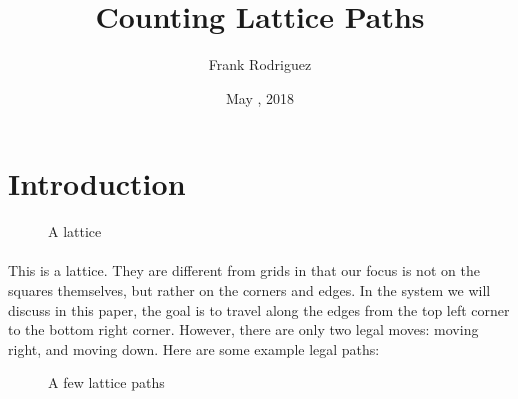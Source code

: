 \documentclass[12pt]{article}
\title{Counting Lattice Paths}
\author{Frank Rodriguez}
\date{May \nth{4}, 2018}
\newcommand{\p}{\paragraph{}}
\begin{document}
	\maketitle
	\newpage
	
	\tableofcontents
	\newpage
	
	\section{Introduction}
	
		\begin{figure}[h]
			\centering
			
			\caption{A lattice}
		\end{figure}
		
		\p This is a lattice. They are different from grids in that our focus is not on the squares themselves, but rather on the corners and edges. In the system we will discuss in this paper, the goal is to travel along the edges from the top left corner to the bottom right corner. However, there are only two legal moves: moving right, and moving down. Here are some example legal paths:
		
		\begin{figure}[h]
			\centering
			\begin{subfigure}{.3\textwidth}
				\centering
			\end{subfigure}%
			\begin{subfigure}{.3\textwidth}
				\centering
			\end{subfigure}%
			\begin{subfigure}{.3\textwidth}
				\centering
			\end{subfigure}
		
			\caption{A few lattice paths}
		\end{figure}
	
\end{document}
